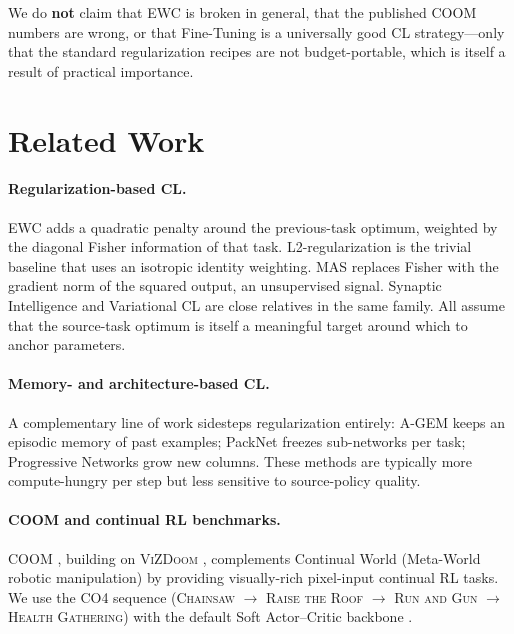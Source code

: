 \documentclass[11pt,a4paper]{article}
\begin{document}
We do \textbf{not} claim that EWC is broken in general, that the published
COOM numbers are wrong, or that Fine-Tuning is a universally good CL
strategy---only that the standard regularization recipes are not
budget-portable, which is itself a result of practical importance.

\section{Related Work}
\label{sec:related}

\paragraph{Regularization-based CL.} EWC \cite{kirkpatrick2017ewc} adds a
quadratic penalty around the previous-task optimum, weighted by the diagonal
Fisher information of that task. L2-regularization is the trivial baseline
that uses an isotropic identity weighting. MAS
\cite{aljundi2018mas} replaces Fisher with the gradient norm of the squared
output, an unsupervised signal. Synaptic Intelligence
\cite{zenke2017si} and Variational CL \cite{nguyen2018vcl} are close
relatives in the same family. All assume that the source-task optimum is
itself a meaningful target around which to anchor parameters.

\paragraph{Memory- and architecture-based CL.} A complementary line of work
sidesteps regularization entirely: A-GEM \cite{chaudhry2019agem} keeps an
episodic memory of past examples; PackNet \cite{mallya2018packnet} freezes
sub-networks per task; Progressive Networks \cite{rusu2016pnn} grow new
columns. These methods are typically more compute-hungry per step but less
sensitive to source-policy quality.

\paragraph{COOM and continual RL benchmarks.} COOM
\cite{tomilin2024coom}, building on \textsc{ViZDoom}
\cite{kempka2016vizdoom}, complements Continual World
\cite{wolczyk2021cwsac} (Meta-World robotic manipulation) by providing
visually-rich pixel-input continual RL tasks. We use the CO4 sequence
(\textsc{Chainsaw} $\rightarrow$ \textsc{Raise the Roof} $\rightarrow$
\textsc{Run and Gun} $\rightarrow$ \textsc{Health Gathering}) with the
default Soft Actor--Critic backbone \cite{haarnoja2018sac}.
\end{document}
